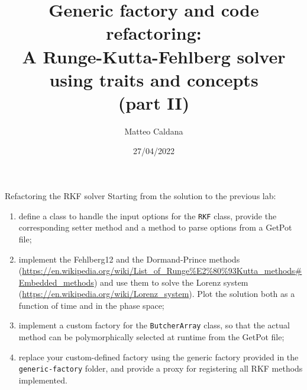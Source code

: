 \documentclass[10pt,aspectratio=169]{beamer}
\begin{document}
\title{Generic factory and code refactoring:\protect\\A Runge-Kutta-Fehlberg solver\protect\\using traits and concepts\protect\\(part II)}
    \author{Matteo Caldana}
    \date{27/04/2022}

\begin{frame}
    \maketitle
\end{frame}

\begin{frame}{Refactoring the RKF solver}
Starting from the solution to the previous lab:
\begin{enumerate}
\item define a class to handle the input options for the \texttt{RKF} class, provide the corresponding setter method and a method to parse options from a GetPot file;
\item implement the Fehlberg12 and the Dormand-Prince methods (\url{https://en.wikipedia.org/wiki/List_of_Runge\%E2\%80\%93Kutta_methods\#Embedded_methods}) and use them to solve the Lorenz system (\url{https://en.wikipedia.org/wiki/Lorenz_system}). Plot the solution both as a function of time and in the phase space;
\item implement a custom factory for the \texttt{ButcherArray} class, so that the actual method can be polymorphically selected at runtime from the GetPot file;
\item replace your custom-defined factory using the generic factory provided in the \texttt{generic-factory} folder, and provide a proxy for registering all RKF methods implemented.
\end{enumerate}
\end{frame}
\end{document}
